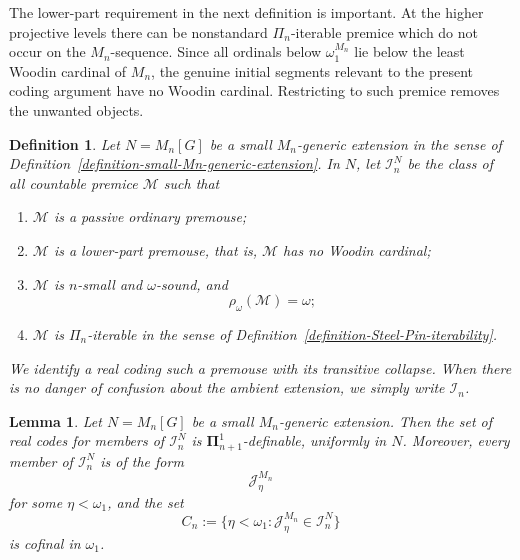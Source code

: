 \documentclass[a4paper,11pt]{article}
\newtheorem{lemma}[theorem]{Lemma}
\newtheorem{definition}[theorem]{Definition}
\begin{document}
The lower-part requirement in the next definition is important.  At the
higher projective levels there can be nonstandard $\Pi_n$-iterable premice
which do not occur on the $M_n$-sequence.  Since all ordinals below
$\omega_1^{M_n}$ lie below the least Woodin cardinal of $M_n$, the genuine
initial segments relevant to the present coding argument have no Woodin
cardinal.  Restricting to such premice removes the unwanted objects.

\begin{definition}
\label{definition-Mn-lower-part-approximations}
Let $N=M_n[G]$ be a small $M_n$-generic extension in the sense of
Definition~\ref{definition-small-Mn-generic-extension}.  In $N$, let
$\mathcal I_n^N$ be the class of all countable premice $\mathcal M$ such that
\begin{enumerate}
   \item $\mathcal M$ is a passive ordinary premouse;
   \item $\mathcal M$ is a lower-part premouse, that is,
         $\mathcal M$ has no Woodin cardinal;
   \item $\mathcal M$ is $n$-small and $\omega$-sound, and
         \[
            \rho_\omega(\mathcal M)=\omega;
         \]
   \item $\mathcal M$ is $\Pi_n$-iterable in the sense of
         Definition~\ref{definition-Steel-Pin-iterability}.
\end{enumerate}
We identify a real coding such a premouse with its transitive collapse.  When
there is no danger of confusion about the ambient extension, we simply write
$\mathcal I_n$.
\end{definition}

\begin{lemma}
\label{lemma-definable-Mn-initial-segments}
Let $N=M_n[G]$ be a small $M_n$-generic extension.  Then the set of real codes
for members of $\mathcal I_n^N$ is $\boldsymbol{\Pi}^1_{n+1}$-definable,
uniformly in $N$.  Moreover, every member of $\mathcal I_n^N$ is of the form
\[
   \mathcal J^{M_n}_\eta
\]
for some $\eta<\omega_1$, and the set
\[
   C_n:=\{\eta<\omega_1:
      \mathcal J^{M_n}_\eta\in\mathcal I_n^N\}
\]
is cofinal in $\omega_1$.
\end{lemma}
\end{document}
